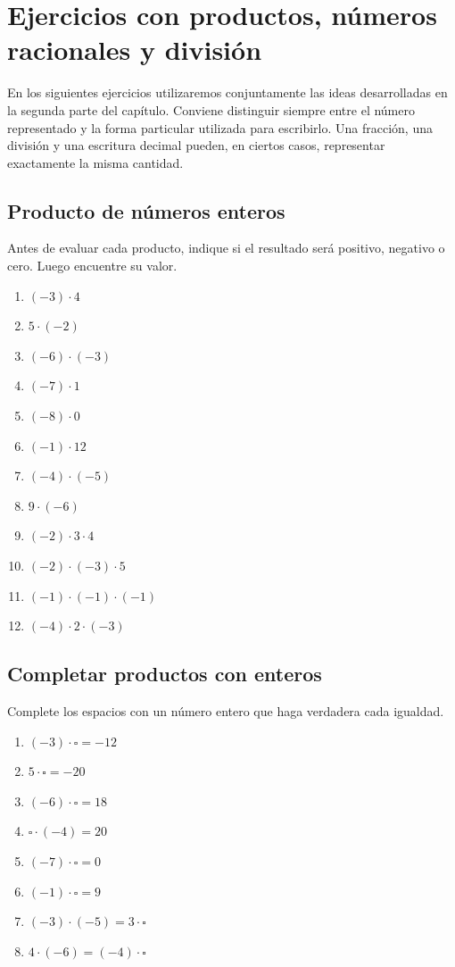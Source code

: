 \section[Práctica con racionales y división]{Ejercicios con productos, números racionales y división}

En los siguientes ejercicios utilizaremos conjuntamente las ideas desarrolladas en la segunda parte del capítulo. Conviene distinguir siempre entre el número representado y la forma particular utilizada para escribirlo. Una fracción, una división y una escritura decimal pueden, en ciertos casos, representar exactamente la misma cantidad.

\subsection*{Producto de números enteros}

Antes de evaluar cada producto, indique si el resultado será positivo, negativo o cero. Luego encuentre su valor.

\begin{enumerate}
\item \((-3)\cdot4\)
\item \(5\cdot(-2)\)
\item \((-6)\cdot(-3)\)
\item \((-7)\cdot1\)
\item \((-8)\cdot0\)
\item \((-1)\cdot12\)
\item \((-4)\cdot(-5)\)
\item \(9\cdot(-6)\)
\item \((-2)\cdot3\cdot4\)
\item \((-2)\cdot(-3)\cdot5\)
\item \((-1)\cdot(-1)\cdot(-1)\)
\item \((-4)\cdot2\cdot(-3)\)
\end{enumerate}

\subsection*{Completar productos con enteros}

Complete los espacios con un número entero que haga verdadera cada igualdad.

\begin{enumerate}
\item \((-3)\cdot\square=-12\)
\item \(5\cdot\square=-20\)
\item \((-6)\cdot\square=18\)
\item \(\square\cdot(-4)=20\)
\item \((-7)\cdot\square=0\)
\item \((-1)\cdot\square=9\)
\item \((-3)\cdot(-5)=3\cdot\square\)
\item \(4\cdot(-6)=(-4)\cdot\square\)
\end{enumerate}

